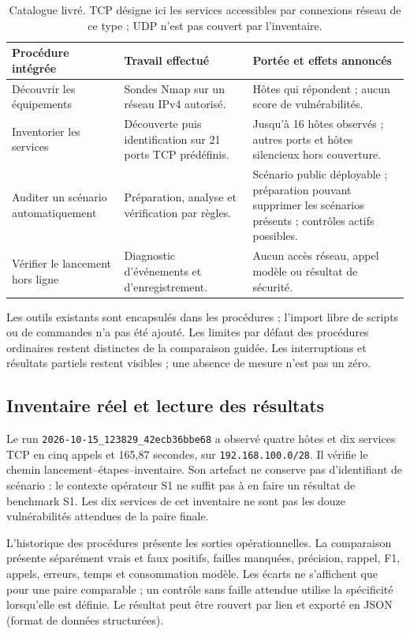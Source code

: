 \documentclass[11pt,a4paper]{article}
\newcommand{\code}[1]{\nolinkurl{#1}}
\begin{document}
\begin{table}[htbp]\centering\small
\begin{tabularx}{\linewidth}{@{}>{\raggedright\arraybackslash}p{35mm}YY@{}}
\toprule
Procédure intégrée & Travail effectué & Portée et effets annoncés \\
\midrule
Découvrir les équipements & Sondes Nmap sur un réseau IPv4 autorisé. & Hôtes qui répondent ; aucun score de vulnérabilités. \\
Inventorier les services & Découverte puis identification sur 21 ports TCP prédéfinis. & Jusqu'à 16 hôtes observés ; autres ports et hôtes silencieux hors couverture. \\
Auditer un scénario automatiquement & Préparation, analyse et vérification par règles. & Scénario public déployable ; préparation pouvant supprimer les scénarios présents ; contrôles actifs possibles. \\
Vérifier le lancement hors ligne & Diagnostic d'événements et d'enregistrement. & Aucun accès réseau, appel modèle ou résultat de sécurité. \\
\bottomrule
\end{tabularx}
\caption{Catalogue livré. TCP désigne ici les services accessibles par connexions réseau de ce type ; UDP n'est pas couvert par l'inventaire.}
\end{table}

Les outils existants sont encapsulés dans les procédures ; l'import libre de
scripts ou de commandes n'a pas été ajouté. Les limites par défaut des procédures
ordinaires restent distinctes de la comparaison guidée. Les interruptions et
résultats partiels restent visibles ; une absence de mesure n'est pas un zéro.

\subsection{Inventaire réel et lecture des résultats}
Le run \code{2026-10-15_123829_42ecb36bbe68} a observé quatre hôtes et dix
services TCP en cinq appels et 165,87 secondes, sur \code{192.168.100.0/28}.
Il vérifie le chemin lancement--étapes--inventaire. Son artefact ne conserve
pas d'identifiant de scénario : le contexte opérateur S1 ne suffit pas à en
faire un résultat de benchmark S1. Les dix services de cet inventaire ne sont
pas les douze vulnérabilités attendues de la paire finale.

L'historique des procédures présente les sorties opérationnelles. La
comparaison présente séparément vrais et faux positifs, failles manquées,
précision, rappel, F1, appels, erreurs, temps et consommation modèle. Les écarts
ne s'affichent que pour une paire comparable ; un contrôle sans faille attendue
utilise la spécificité lorsqu'elle est définie. Le résultat peut être rouvert
par lien et exporté en JSON (format de données structurées).
\end{document}
